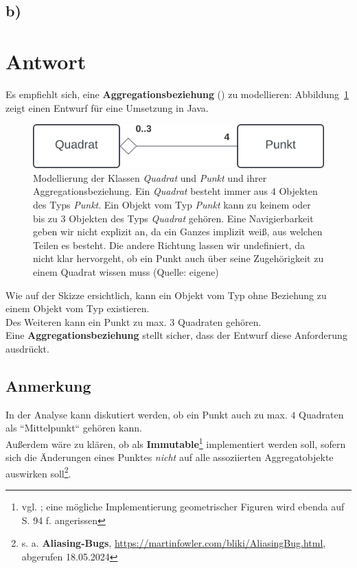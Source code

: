 \subsection*{b)}

\section*{Antwort}

Es empfiehlt sich, eine \textbf{Aggregationsbeziehung} (\cite[48]{Bal05}) zu modellieren: Abbildung~\ref{fig:aufgabe-4-teil-b} zeigt einen Entwurf für eine Umsetzung in Java.\\

\begin{figure}
    \centering
    \includegraphics[scale=0.5]{chapters/aufgabe 4/img/aufgabe4b}
    \caption{Modellierung der Klassen \textit{Quadrat} und \textit{Punkt} und ihrer Aggregationsbeziehung.
    Ein \textit{Quadrat} besteht immer aus $4$ Objekten des Typs \textit{Punkt}. Ein Objekt vom Typ \textit{Punkt} kann zu keinem oder bis zu 3 Objekten des Typs \textit{Quadrat} gehören. Eine Navigierbarkeit geben wir nicht explizit an, da ein Ganzes implizit weiß, aus welchen Teilen es besteht. Die andere Richtung lassen wir undefiniert, da nicht klar hervorgeht, ob ein Punkt auch über seine Zugehörigkeit zu einem Quadrat wissen muss (Quelle: eigene)}
    \label{fig:aufgabe-4-teil-b}
\end{figure}

\noindent
Wie auf der Skizze ersichtlich, kann ein Objekt vom Typ  ohne Beziehung zu einem Objekt vom Typ  existieren.\\
Des Weiteren kann ein Punkt zu max. $3$ Quadraten gehören.\\
Eine  \textbf{Aggregationsbeziehung} stellt sicher, dass der Entwurf diese Anforderung ausdrückt.\\

\subsection*{Anmerkung}
In der Analyse kann diskutiert werden, ob ein Punkt auch zu max. $4$ Quadraten als ``Mittelpunkt`` gehören kann.\\
Außerdem wäre zu klären, ob  als \textbf{Immutable}\footnote{
    vgl. \cite[21]{LG00}; eine mögliche Implementierung geometrischer Figuren wird ebenda auf S. 94 f. angerissen
} implementiert werden soll, sofern sich die Änderungen eines Punktes \textit{nicht} auf alle assoziierten Aggregatobjekte auswirken soll\footnote{
    s. a. \textbf{Aliasing-Bugs}, \url{https://martinfowler.com/bliki/AliasingBug.html}, abgerufen 18.05.2024
}.


